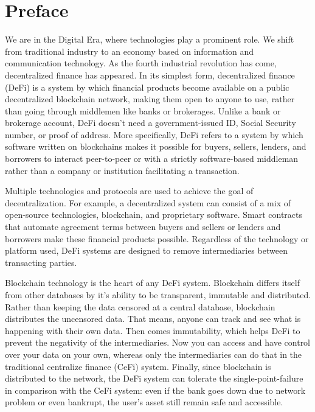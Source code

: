 \chapter*{Preface}
\thispagestyle{fancy}
\label{preface}
\hspace*{5cm}

We are in the Digital Era, where technologies play a prominent role. We shift from traditional industry to an economy based on information and communication technology. As the fourth industrial revolution has come, decentralized finance has appeared. In its simplest form, decentralized finance (DeFi) is a system by which financial products become available on a public decentralized blockchain network, making them open to anyone to use, rather than going through middlemen like banks or brokerages. Unlike a bank or brokerage account, DeFi doesn't need a government-issued ID, Social Security number, or proof of address. More specifically, DeFi refers to a system by which software written on blockchains makes it possible for buyers, sellers, lenders, and borrowers to interact peer-to-peer or with a strictly software-based middleman rather than a company or institution facilitating a transaction.

Multiple technologies and protocols are used to achieve the goal of decentralization. For example, a decentralized system can consist of a mix of open-source technologies, blockchain, and proprietary software. Smart contracts that automate agreement terms between buyers and sellers or lenders and borrowers make these financial products possible. Regardless of the technology or platform used, DeFi systems are designed to remove intermediaries between transacting parties.

Blockchain technology is the heart of any DeFi system. Blockchain differs itself from other databases by it's ability to be transparent, immutable and distributed. Rather than keeping the data censored at a central database, blockchain distributes the uncensored data. That means, anyone can track and see what is happening with their own data. Then comes immutability, which helps DeFi to prevent the negativity of the intermediaries. Now you can access and have control over your data on your own, whereas only the intermediaries can do that in the traditional centralize finance (CeFi) system. Finally, since blockchain is distributed to the network, the DeFi system can tolerate the single-point-failure in comparison with the CeFi system: even if the bank goes down due to network problem or even bankrupt, the user's asset still remain safe and accessible.

